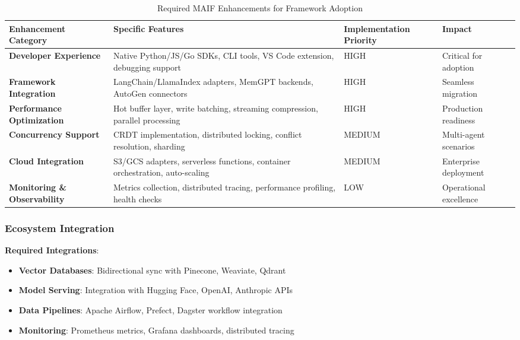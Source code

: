 \documentclass[conference]{IEEEtran}
\begin{document}
\begin{table*}[!t]
\renewcommand{\arraystretch}{1.3}
\caption{Required MAIF Enhancements for Framework Adoption}
\label{tab:maif-enhancements}
\centering
\footnotesize
\begin{tabular}{p{3cm}p{5cm}p{4cm}p{3cm}}
\toprule
\textbf{Enhancement Category} & \textbf{Specific Features} & \textbf{Implementation Priority} & \textbf{Impact} \\
\midrule
\textbf{Developer Experience} & Native Python/JS/Go SDKs, CLI tools, VS Code extension, debugging support & HIGH & Critical for adoption \\
\textbf{Framework Integration} & LangChain/LlamaIndex adapters, MemGPT backends, AutoGen connectors & HIGH & Seamless migration \\
\textbf{Performance Optimization} & Hot buffer layer, write batching, streaming compression, parallel processing & HIGH & Production readiness \\
\textbf{Concurrency Support} & CRDT implementation, distributed locking, conflict resolution, sharding & MEDIUM & Multi-agent scenarios \\
\textbf{Cloud Integration} & S3/GCS adapters, serverless functions, container orchestration, auto-scaling & MEDIUM & Enterprise deployment \\
\textbf{Monitoring \& Observability} & Metrics collection, distributed tracing, performance profiling, health checks & LOW & Operational excellence \\
\bottomrule
\end{tabular}
\end{table*}

\subsubsection{Ecosystem Integration}

\textbf{Required Integrations}:
\begin{itemize}[leftmargin=*]
\item \textbf{Vector Databases}: Bidirectional sync with Pinecone, Weaviate, Qdrant
\item \textbf{Model Serving}: Integration with Hugging Face, OpenAI, Anthropic APIs
\item \textbf{Data Pipelines}: Apache Airflow, Prefect, Dagster workflow integration
\item \textbf{Monitoring}: Prometheus metrics, Grafana dashboards, distributed tracing
\end{itemize}
\end{document}
